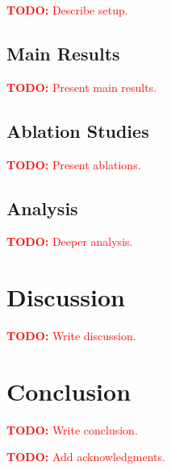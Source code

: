 \documentclass{article}
\theoremstyle{definition}
\theoremstyle{remark}
\newcommand{\todo}[1]{\textcolor{red}{\textbf{TODO:} #1}}
\begin{document}
\todo{Describe setup.}

\subsection{Main Results}
\label{sec:main_results}

\todo{Present main results.}

\subsection{Ablation Studies}
\label{sec:ablations}

\todo{Present ablations.}

\subsection{Analysis}
\label{sec:analysis}

\todo{Deeper analysis.}

\section{Discussion}
\label{sec:discussion}


\todo{Write discussion.}

\section{Conclusion}
\label{sec:conclusion}


\todo{Write conclusion.}

\begin{ack}
\todo{Add acknowledgments.}
\end{ack}
\end{document}

